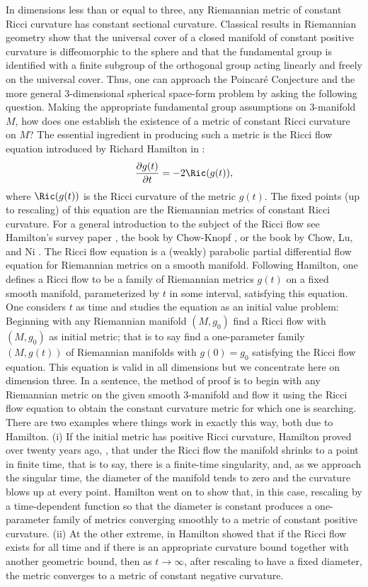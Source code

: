 In dimensions less than or equal to three, any Riemannian metric of constant
Ricci curvature has constant sectional curvature. Classical results in
Riemannian geometry show that the universal cover of a closed manifold of
constant positive curvature is diffeomorphic to the sphere and that the
fundamental group is identified with a finite subgroup of the orthogonal group
acting linearly and freely on the universal cover. Thus, one can approach the
Poincar\'e Conjecture and the more general $3$-dimensional spherical space-form
problem by asking the following question. Making the appropriate fundamental
group assumptions on $3$-manifold $M$, how does one establish the existence of
a metric of constant Ricci curvature on $M$? The essential ingredient in
producing such a metric is the Ricci flow equation
introduced by Richard Hamilton in \cite{Hamilton3MPRC}:
$$\frac{\partial g(t)}{\partial t}=-2\Ric(g(t)),$$
where $\Ric(g(t))$ is the Ricci curvature of the metric $g(t)$.
The fixed points (up to rescaling) of this equation are the
Riemannian metrics of constant Ricci curvature. For a general
introduction to the subject of the Ricci flow see Hamilton's survey
paper \cite{Hamiltonsurvey}, the book by Chow-Knopf
\cite{ChowKnopf}, or the book by Chow, Lu, and Ni \cite{ChowLuNi}.
The Ricci flow equation is a (weakly) parabolic partial differential
flow equation for Riemannian metrics on a smooth manifold. Following
Hamilton, one defines a Ricci flow to be a family
of Riemannian metrics $g(t)$ on a fixed smooth manifold,
parameterized by $t$ in some interval, satisfying this equation. One
considers $t$ as time and studies the equation as an initial value
problem: Beginning with any Riemannian manifold $(M,g_0)$ find a
Ricci flow with $(M,g_0)$ as initial metric; that is to say find a
one-parameter family $(M,g(t))$ of Riemannian manifolds with
$g(0)=g_0$ satisfying the Ricci flow equation. This equation is
valid in all dimensions but we concentrate here on dimension three.
In a sentence, the method of proof is to begin with any Riemannian
metric on the given smooth $3$-manifold and flow it using the Ricci
flow equation to obtain the constant curvature metric for which one
is searching. There are two examples where things work in exactly
this way, both due to Hamilton. (i) If the initial metric has
positive Ricci curvature, Hamilton proved over twenty years ago,
\cite{Hamilton3MPRC}, that under the Ricci flow the manifold shrinks
to a point in finite time, that is to say, there is a finite-time
singularity, and, as we approach the singular time, the diameter of
the manifold tends to zero and the curvature blows up at every
point. Hamilton went on to show that, in this case, rescaling by a
time-dependent function so that the diameter is constant produces a
one-parameter family of metrics converging smoothly to a metric of
constant positive curvature. (ii) At the other extreme, in
\cite{HamiltonNSRF3M} Hamilton showed that if the Ricci flow exists
for all time and if there is an appropriate curvature bound together
with another geometric bound, then as $t\rightarrow\infty$, after
rescaling to have a fixed diameter, the metric converges to a metric
of constant negative curvature.

